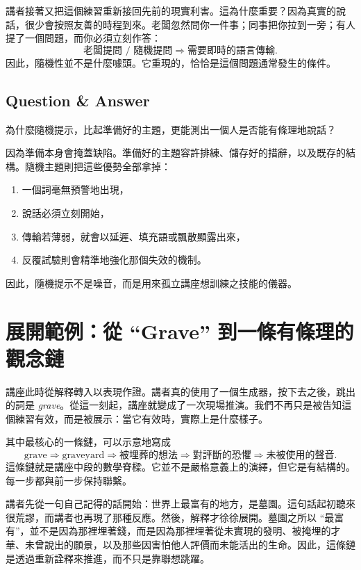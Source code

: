 講者接著又把這個練習重新接回先前的現實利害。這為什麼重要？因為真實的說話，很少會按照友善的時程到來。老闆忽然問你一件事；同事把你拉到一旁；有人提了一個問題，而你必須立刻作答：
\begin{equation}
\text{老闆提問 / 隨機提問} \Longrightarrow \text{需要即時的語言傳輸}.
\end{equation}
因此，隨機性並不是什麼噱頭。它重現的，恰恰是這個問題通常發生的條件。

\subsection{Question \& Answer}

為什麼隨機提示，比起準備好的主題，更能測出一個人是否能有條理地說話？

因為準備本身會掩蓋缺陷。準備好的主題容許排練、儲存好的措辭，以及既存的結構。隨機主題則把這些優勢全部拿掉：
\begin{enumerate}
\item 一個詞毫無預警地出現，
\item 說話必須立刻開始，
\item 傳輸若薄弱，就會以延遲、填充語或飄散顯露出來，
\item 反覆試驗則會精準地強化那個失效的機制。
\end{enumerate}
因此，隨機提示不是噪音，而是用來孤立講座想訓練之技能的儀器。

\section{展開範例：從 ``Grave'' 到一條有條理的觀念鏈}

講座此時從解釋轉入以表現作證。講者真的使用了一個生成器，按下去之後，跳出的詞是 \emph{grave}。從這一刻起，講座就變成了一次現場推演。我們不再只是被告知這個練習有效，而是被展示：當它有效時，實際上是什麼樣子。

其中最核心的一條鏈，可以示意地寫成
\begin{equation}
\text{grave} \Longrightarrow \text{graveyard} \Longrightarrow \text{被埋葬的想法} \Longrightarrow \text{對評斷的恐懼} \Longrightarrow \text{未被使用的聲音}.
\end{equation}
這條鏈就是講座中段的數學脊樑。它並不是嚴格意義上的演繹，但它是有結構的。每一步都與前一步保持聯繫。

講者先從一句自己記得的話開始：世界上最富有的地方，是墓園。這句話起初聽來很荒謬，而講者也再現了那種反應。然後，解釋才徐徐展開。墓園之所以 ``最富有''，並不是因為那裡埋著錢，而是因為那裡埋著從未實現的發明、被掩埋的才華、未曾說出的願景，以及那些因害怕他人評價而未能活出的生命。因此，這條鏈是透過重新詮釋來推進，而不只是靠聯想跳躍。


